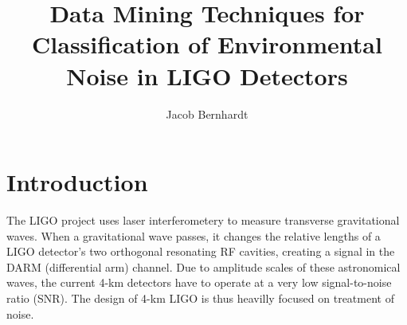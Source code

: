 \documentclass[colorlinks=true,pdfstartview=FitV,linkcolor=blue,
            citecolor=red,urlcolor=magenta]{ligodoc}
\title{Data Mining Techniques for Classification of Environmental Noise in LIGO Detectors}
\author{Jacob Bernhardt}
\begin{document}

\section{Introduction}
The LIGO project uses laser interferometery to measure transverse gravitational waves.
When a gravitational wave passes, it changes the relative lengths of a LIGO detector's two orthogonal resonating RF cavities, creating a signal in the DARM (differential arm) channel.
Due to amplitude scales of these astronomical waves, the current 4-km detectors have to operate at a very low signal-to-noise ratio (SNR).
The design of 4-km LIGO is thus heavilly focused on treatment of noise.
\end{document}

